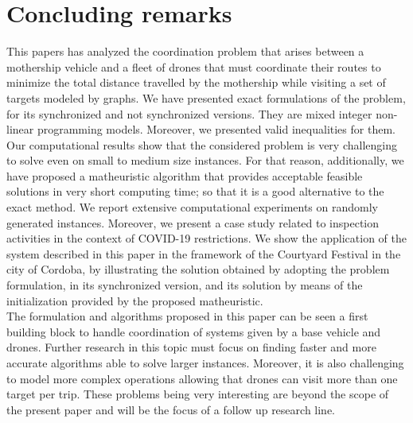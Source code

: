\section{Concluding remarks}
\noindent
This papers has analyzed the coordination problem that arises between a mothership vehicle and a fleet of drones that must coordinate their routes to minimize the total distance travelled by the mothership while visiting a set of targets modeled by graphs. We have presented exact formulations of the problem, for its synchronized and not synchronized versions. They are mixed integer non-linear programming models. Moreover, we presented valid inequalities for them. \\
Our computational results show that the considered problem is very challenging to solve even on small to medium size instances. For that reason, additionally, we have proposed a matheuristic algorithm that provides acceptable feasible solutions in very short computing time; so that it is a good alternative to the exact method. We report extensive computational experiments on randomly generated instances. Moreover, we present a case study related to inspection activities in the context of COVID-19 restrictions. We show the application of the system described in this paper in the framework of the Courtyard Festival in the city of Cordoba, by illustrating the solution obtained by adopting the problem formulation, in its synchronized version, and its solution by means of the initialization provided by the proposed matheuristic.\\
\noindent
The formulation and algorithms proposed in this paper can be seen a first building block to handle coordination of systems given by a base vehicle and drones. Further research in this topic must focus on finding faster and more accurate algorithms able to solve larger instances. Moreover, it is also challenging to model more complex operations  allowing that drones can visit more than one target per trip. These problems being very interesting are beyond the scope of the present paper and will be the focus of a follow up research line.
